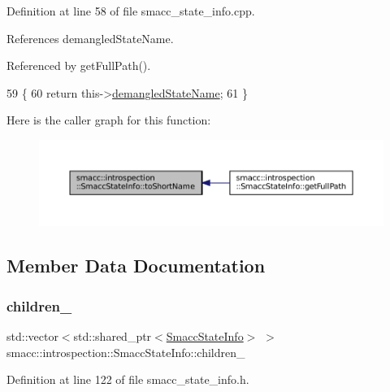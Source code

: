 Definition at line 58 of file smacc\+\_\+state\+\_\+info.\+cpp.



References demangled\+State\+Name.



Referenced by get\+Full\+Path().


\begin{DoxyCode}
59 \{
60     \textcolor{keywordflow}{return} this->\hyperlink{classsmacc_1_1introspection_1_1SmaccStateInfo_acf0014a819c23caad085ba6df13a17bf}{demangledStateName};
61 \}
\end{DoxyCode}
Here is the caller graph for this function\+:
\nopagebreak
\begin{figure}[H]
\begin{center}
\leavevmode
\includegraphics[width=350pt]{classsmacc_1_1introspection_1_1SmaccStateInfo_a39d7f8a587087b6abd0752058e2d8301_icgraph}
\end{center}
\end{figure}


\subsection{Member Data Documentation}
\mbox{\label{classsmacc_1_1introspection_1_1SmaccStateInfo_a73eac049e8149b6eaeec735101c32ef9}} 
\subsubsection{\texorpdfstring{children\+\_\+}{children\_}}
{\footnotesize\ttfamily std\+::vector$<$std\+::shared\+\_\+ptr$<$\hyperlink{classsmacc_1_1introspection_1_1SmaccStateInfo}{Smacc\+State\+Info}$>$ $>$ smacc\+::introspection\+::\+Smacc\+State\+Info\+::children\+\_\+}



Definition at line 122 of file smacc\+\_\+state\+\_\+info.\+h.



